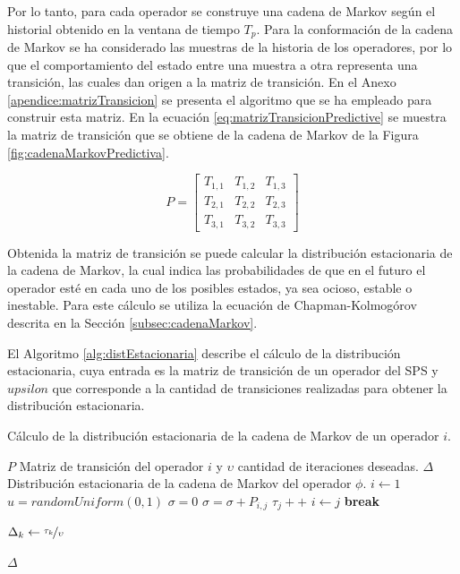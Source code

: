 Por lo tanto, para cada operador se construye una cadena de Markov seg\'un el historial obtenido en la ventana de tiempo $T_p$. Para la conformaci\'on de la cadena de Markov se ha considerado las muestras de la historia de los operadores, por lo que el comportamiento del estado entre una muestra a otra representa una transici\'on, las cuales dan origen a la matriz de transici\'on. En el Anexo \ref{apendice:matrizTransicion} se presenta el algoritmo que se ha empleado para construir esta matriz. En la ecuaci\'on \ref{eq:matrizTransicionPredictive} se muestra la matriz de transici\'on que se obtiene de la cadena de Markov de la Figura \ref{fig:cadenaMarkovPredictiva}.

\begin{equation} \label{eq:matrizTransicionPredictive}
	P =
	\begin{bmatrix}
		T_{1,1} & T_{1,2} & T_{1,3} \\
		T_{2,1} & T_{2,2} & T_{2,3} \\
		T_{3,1} & T_{3,2} & T_{3,3}
	\end{bmatrix}	
\end{equation}

Obtenida la matriz de transici\'on se puede calcular la distribuci\'on estacionaria de la cadena de Markov, la cual indica las probabilidades de que en el futuro el operador est\'e en cada uno de los posibles estados, ya sea ocioso, estable o inestable. Para este c\'alculo se utiliza la ecuaci\'on de Chapman-Kolmog\'orov \citep{Papoulis1984} descrita en la Secci\'on \ref{subsec:cadenaMarkov}.

El Algoritmo \ref{alg:distEstacionaria} describe el c\'alculo de la distribuci\'on estacionaria, cuya entrada es la matriz de transici\'on de un operador del SPS y $upsilon$ que corresponde a la cantidad de transiciones realizadas para obtener la distribuci\'on estacionaria. 

\begin{algorithm}[!t]
	\caption{C\'alculo de la distribuci\'on estacionaria de la cadena de Markov de un operador $i$.}
	\label{alg:distEstacionaria}
	\begin{algorithmic}[1]
	\REQUIRE $P$ Matriz de transici\'on del operador $i$ y $\upsilon$ cantidad de iteraciones deseadas.
	\ENSURE $\Delta$ Distribuci\'on estacionaria de la cadena de Markov del operador $\phi$.
	\STATE $i \leftarrow 1$
		\STATE $u = randomUniform(0,1)$
		\STATE $\sigma = 0$
			\STATE $\sigma = \sigma + P_{i,j}$
				\STATE $\tau_{j}++$
				\STATE $i \leftarrow j$
				\STATE \textbf{break}
			\ENDIF
		\ENDFOR
	\ENDFOR

		\STATE $\Delta_{k} \leftarrow \nicefrac{\tau_{k}}{\upsilon}$
	\ENDFOR	
	
	\RETURN $\Delta$
	
	\end{algorithmic}
\end{algorithm}

